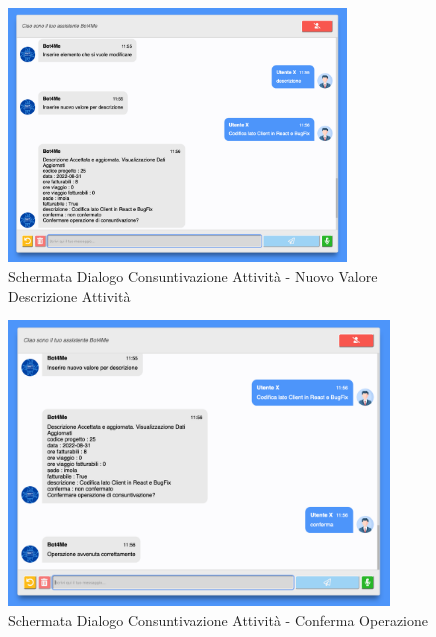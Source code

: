\begin{figure}[H]
    \centering\includegraphics[width=0.8\textwidth, height=0.7\textheight, keepaspectratio]{images/schermata_consultivazione_4.png}
    \caption{Schermata Dialogo Consuntivazione Attività - Nuovo Valore Descrizione Attività}
\end{figure}

\begin{figure}[H]
    \centering\includegraphics[width=0.9\textwidth, height=0.7\textheight, keepaspectratio]{images/schermata_consultivazione_5.png}
    \caption{Schermata Dialogo Consuntivazione Attività - Conferma Operazione}
\end{figure}